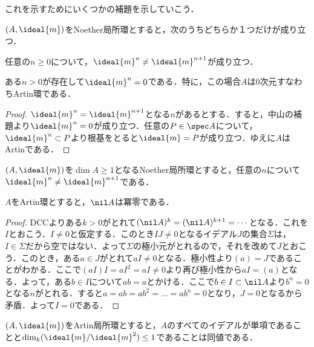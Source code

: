 これを示すためにいくつかの補題を示していこう．

\begin{prop}\label{prop:局所環がm^n=0ならArtin}
	$(A,\ideal{m})$をNoether局所環とすると，次のうちどちらか１つだけが成り立つ．
	\begin{sakura}
		\item 任意の$n\geq0$について，$\ideal{m}^n\neq\ideal{m}^{n+1}$が成り立つ．
		\item ある$n>0$が存在して$\ideal{m}^n=0$である．特に，この場合$A$は0次元すなわちArtin環である．
	\end{sakura}
\end{prop}

\begin{proof}
	$\ideal{m}^n=\ideal{m}^{n+1}$となる$n$があるとする．すると，中山の補題より$\ideal{m}^n=0$が成り立つ．任意の$P\in\spec A$について，$\ideal{m}^n\subset P$より根基をとると$\ideal{m}=P$が成り立つ．ゆえに$A$はArtinである．
\end{proof}

\begin{cor}\label{lem:DVR-A}
	$(A,\ideal{m})$を$\dim A\geq1$となるNoether局所環とすると，任意の$n$について$\ideal{m}^n\neq\ideal{m}^{n+1}$である．
\end{cor}

\begin{lem}\label{lem:Artinならnil Aは冪零}
	$A$をArtin環とすると，$\nil A$は冪零である．
\end{lem}

\begin{proof}
	DCCよりある$k>0$がとれて$(\nil A)^k=(\nil A)^{k+1}=\cdots$となる．これを$I$とおこう．$I\neq0$と仮定する．このとき$IJ\neq0$となるイデアル$J$の集合$\Sigma$は，$I\in\Sigma$だから空ではない．よって$\Sigma$の極小元がとれるので，それを改めて$J$とおこう．このとき，ある$a\in J$がとれて$aI\neq0$となる．極小性より$(a)=J$であることがわかる．ここで$(aI)I=aI^2=aI\neq0$より再び極小性から$aI=(a)$となる．よって，ある$b\in I$について$ab=a$とかける．ここで$b\in I\subset\nil A$より$b^n=0$となる$n$がとれる．すると$a=ab=ab^2=\dots=ab^n=0$となり，$J=0$となるから矛盾．よって$I=0$である．
\end{proof}

\begin{prop}\label{lem:DVR-B}
	$(A,\ideal{m})$をArtin局所環とすると，$A$のすべてのイデアルが単項であることと$\dim_k(\ideal{m}/\ideal{m}^2)\leq1$であることは同値である．
\end{prop}

